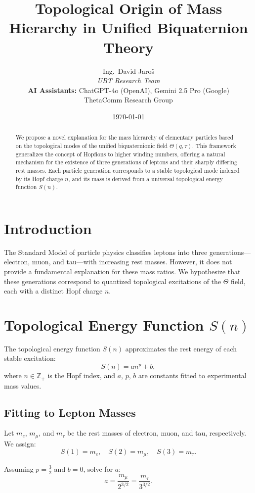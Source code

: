 \documentclass[12pt]{article}
\title{Topological Origin of Mass Hierarchy in Unified Biquaternion Theory}
\author{
Ing.~David Jaroš \\
\textit{UBT Research Team} \\
\textbf{AI Assistants:} ChatGPT-4o (OpenAI), Gemini 2.5 Pro (Google) \\
ThetaComm Research Group}
\date{\today}
\begin{document}
\maketitle

\begin{abstract}
We propose a novel explanation for the mass hierarchy of elementary particles based on the topological modes of the unified biquaternionic field $\Theta(q, \tau)$. This framework generalizes the concept of Hopfions to higher winding numbers, offering a natural mechanism for the existence of three generations of leptons and their sharply differing rest masses. Each particle generation corresponds to a stable topological mode indexed by its Hopf charge $n$, and its mass is derived from a universal topological energy function $S(n)$.
\end{abstract}

\section{Introduction}

The Standard Model of particle physics classifies leptons into three generations---electron, muon, and tau---with increasing rest masses. However, it does not provide a fundamental explanation for these mass ratios. We hypothesize that these generations correspond to quantized topological excitations of the $\Theta$ field, each with a distinct Hopf charge $n$.

\section{Topological Energy Function $S(n)$}

The topological energy function $S(n)$ approximates the rest energy of each stable excitation:
\[
S(n) = a n^p + b,
\]
where $n \in \mathbb{Z}_+$ is the Hopf index, and $a$, $p$, $b$ are constants fitted to experimental mass values.

\subsection{Fitting to Lepton Masses}

Let $m_e$, $m_\mu$, and $m_\tau$ be the rest masses of electron, muon, and tau, respectively. We assign:
\[
S(1) = m_e,\quad S(2) = m_\mu,\quad S(3) = m_\tau.
\]

Assuming $p = \frac{3}{2}$ and $b = 0$, solve for $a$:
\[
a = \frac{m_\mu}{2^{3/2}} = \frac{m_\tau}{3^{3/2}}.
\]
\end{document}
